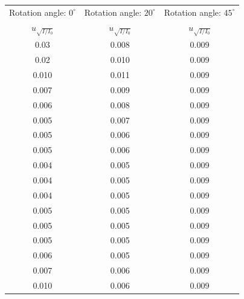 \documentclass[a4paper]{article}
\begin{document}
\begin{table}[H]
	\centering
	\begin{tabular}{ccc}
		\hline
		Rotation angle: $0^\circ$ & Rotation angle: $20^\circ$ & Rotation angle: $45^\circ$ \\
		$u_{\sqrt{I/I_{0}}}$      & $u_{\sqrt{I/I_{0}}}$       & $u_{\sqrt{I/I_{0}}}$       \\
		\hline
		0.03                      & 0.008                      & 0.009                      \\
		0.02                      & 0.010                      & 0.009                      \\
		0.010                     & 0.011                      & 0.009                      \\
		0.007                     & 0.009                      & 0.009                      \\
		0.006                     & 0.008                      & 0.009                      \\
		0.005                     & 0.007                      & 0.009                      \\
		0.005                     & 0.006                      & 0.009                      \\
		0.005                     & 0.006                      & 0.009                      \\
		0.004                     & 0.005                      & 0.009                      \\
		0.004                     & 0.005                      & 0.009                      \\
		0.004                     & 0.005                      & 0.009                      \\
		0.005                     & 0.005                      & 0.009                      \\
		0.005                     & 0.005                      & 0.009                      \\
		0.005                     & 0.005                      & 0.009                      \\
		0.006                     & 0.005                      & 0.009                      \\
		0.007                     & 0.006                      & 0.009                      \\
		0.010                     & 0.006                      & 0.009                      \\

\end{tabular}
\end{table}
\end{document}
